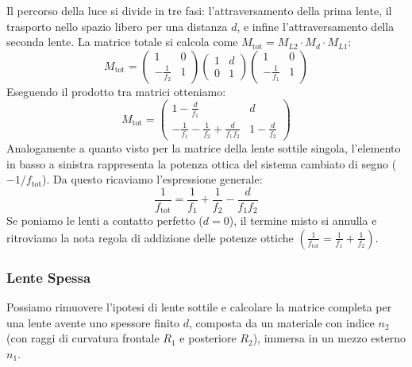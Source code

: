 \documentclass[openany,a4paper,12pt]{book}
\begin{document}
Il percorso della luce si divide in tre fasi: l'attraversamento della prima lente, il trasporto nello spazio libero per una distanza $d$, e infine l'attraversamento della seconda lente. La matrice totale si calcola come $M_{\text{tot}} = M_{L2} \cdot M_{d} \cdot M_{L1}$:
\begin{equation}
M_{\text{tot}} = 
\begin{pmatrix}
    1 & 0 \\ 
    -\frac{1}{f_2} & 1   
\end{pmatrix}     
\begin{pmatrix}
    1 & d \\ 
    0 & 1   
\end{pmatrix}
\begin{pmatrix}
    1 & 0 \\ 
    -\frac{1}{f_1} & 1   
\end{pmatrix}
\end{equation}
Eseguendo il prodotto tra matrici otteniamo:
\begin{equation}
M_{\text{tot}} = 
\begin{pmatrix}
    1 - \frac{d}{f_1} & d \\[1ex]
    -\frac{1}{f_1} - \frac{1}{f_2} + \frac{d}{f_1 f_2} & 1 - \frac{d}{f_2}   
\end{pmatrix}   
\end{equation}
Analogamente a quanto visto per la matrice della lente sottile singola, l'elemento in basso a sinistra rappresenta la potenza ottica del sistema cambiato di segno ($-1/f_{\text{tot}}$). Da questo ricaviamo l'espressione generale:
\begin{equation}
    \frac{1}{f_{\text{tot}}} = \frac{1}{f_1} + \frac{1}{f_2} - \frac{d}{f_1 f_2}
\end{equation}
Se poniamo le lenti a contatto perfetto ($d=0$), il termine misto si annulla e ritroviamo la nota regola di addizione delle potenze ottiche $\left(\frac{1}{f_{\text{tot}}} = \frac{1}{f_1} + \frac{1}{f_2}\right)$.

\subsubsection{Lente Spessa}
Possiamo rimuovere l'ipotesi di lente sottile e calcolare la matrice completa per una lente avente uno spessore finito $d$, composta da un materiale con indice $n_2$ (con raggi di curvatura frontale $R_1$ e posteriore $R_2$), immersa in un mezzo esterno $n_1$. 
\end{document}
